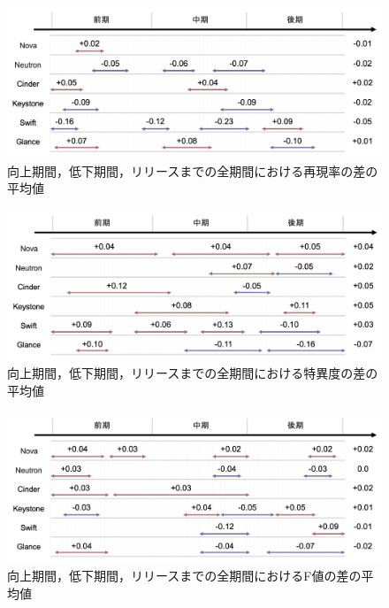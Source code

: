\documentclass[11pt]{jreport}
\begin{document}
\begin{figure}[t]
\begin{center}
    \includegraphics[width=1.0\textwidth]{Uenaka_fig/RQ2_result/review_R.pdf}
    \caption{向上期間，低下期間，リリースまでの全期間における再現率の差の平均値}
    \label{fig:review_prepare_R}
\end{center}
\end{figure}

\begin{figure}[t]
\begin{center}
    \includegraphics[width=1.0\textwidth]{Uenaka_fig/RQ2_result/review_S.pdf}
    \caption{向上期間，低下期間，リリースまでの全期間における特異度の差の平均値}
    \label{fig:review_prepare_S}
\end{center}
\end{figure}

\begin{figure}[t]
\begin{center}
    \includegraphics[width=1.0\textwidth]{Uenaka_fig/RQ2_result/review_F.pdf}
    \caption{向上期間，低下期間，リリースまでの全期間におけるF値の差の平均値}
    \label{fig:review_prepare_F}
\end{center}
\end{figure}
\end{document}
